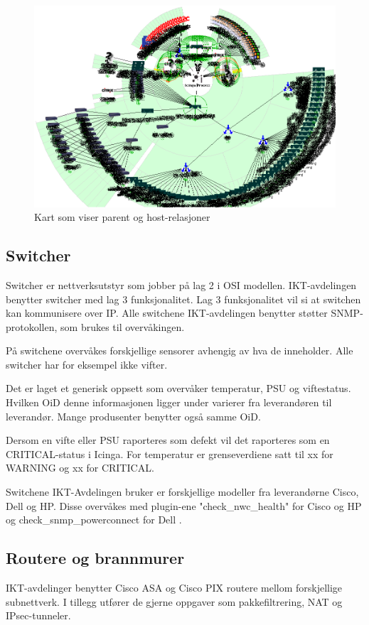 \begin{figure}
    \centering
    \includegraphics[scale=0.6]{img/statusmap}
    \caption{Kart som viser parent og host-relasjoner}
    \label{statusmap}
\end{figure}


\subsection{Switcher}
Switcher er nettverksutstyr som jobber på lag 2 i OSI modellen. IKT-avdelingen benytter switcher med lag 3 funksjonalitet. Lag 3 funksjonalitet vil si at switchen kan kommunisere over IP. Alle switchene IKT-avdelingen benytter støtter SNMP-protokollen, som brukes til overvåkingen.

På switchene overvåkes forskjellige sensorer avhengig av hva de inneholder. Alle switcher har for eksempel ikke vifter.

Det er laget et generisk oppsett som overvåker temperatur, PSU og viftestatus. Hvilken OiD denne informasjonen ligger under varierer fra leverandøren til leverandør. Mange produsenter benytter også samme OiD. 

Dersom en vifte eller PSU raporteres som defekt vil det raporteres som en CRITICAL-status i Icinga. For temperatur er grenseverdiene satt til xx for WARNING og xx for CRITICAL.

Switchene IKT-Avdelingen bruker er forskjellige modeller fra leverandørne Cisco, Dell og HP. Disse overvåkes med plugin-ene "check\_nwc\_health" \cite{nwchealth} for Cisco og HP og check\_snmp\_powerconnect for Dell \cite{checkpowerconnect}.

\subsection{Routere og brannmurer}
IKT-avdelinger benytter Cisco ASA og Cisco PIX routere mellom forskjellige subnettverk. I tillegg utfører de gjerne oppgaver som pakkefiltrering, NAT og IPsec-tunneler.
